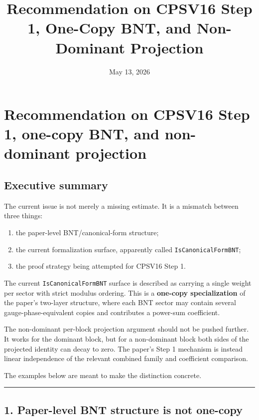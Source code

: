 \documentclass[
  11pt,
]{article}
\title{Recommendation on CPSV16 Step 1, One-Copy BNT, and Non-Dominant
Projection}
\author{}
\date{May 13, 2026}
\providecommand{\tightlist}{%
  \setlength{\itemsep}{0pt}\setlength{\parskip}{0pt}}
\begin{document}
\maketitle

\section{Recommendation on CPSV16 Step 1, one-copy BNT, and non-dominant
projection}\label{recommendation-on-cpsv16-step-1-one-copy-bnt-and-non-dominant-projection}

\subsection{Executive summary}\label{executive-summary}

The current issue is not merely a missing estimate. It is a mismatch
between three things:

\begin{enumerate}
\def\labelenumi{\arabic{enumi}.}
\tightlist
\item
  the paper-level BNT/canonical-form structure;
\item
  the current formalization surface, apparently called
  \texttt{IsCanonicalFormBNT};
\item
  the proof strategy being attempted for CPSV16 Step 1.
\end{enumerate}

The current \texttt{IsCanonicalFormBNT} surface is described as carrying
a single weight per sector with strict modulus ordering. This is a
\textbf{one-copy specialization} of the paper's two-layer structure,
where each BNT sector may contain several gauge-phase-equivalent copies
and contributes a power-sum coefficient.

The non-dominant per-block projection argument should not be pushed
further. It works for the dominant block, but for a non-dominant block
both sides of the projected identity can decay to zero. The paper's Step
1 mechanism is instead linear independence of the relevant combined
family and coefficient comparison.

The examples below are meant to make the distinction concrete.

\begin{center}\rule{0.5\linewidth}{0.5pt}\end{center}

\subsection{1. Paper-level BNT structure is not
one-copy}\label{paper-level-bnt-structure-is-not-one-copy}
\end{document}

